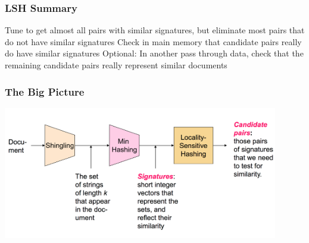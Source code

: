 \documentclass[svgnames]{beamer}
\begin{document}
\begin{frame} \frametitle{LSH Summary}

Tune to get almost all pairs with similar signatures, but eliminate most pairs that do not have similar signatures
Check in main memory that candidate pairs really do have similar signatures
Optional: In another pass through data, check that the remaining candidate pairs really represent similar documents

\end{frame}

  
\begin{frame} \frametitle{The Big Picture}

\includegraphics[width=12cm]{overall}

\end{frame}


\end{document}
